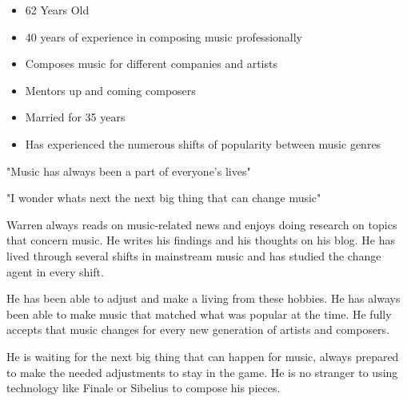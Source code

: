 \begin{itemize}
\item 62 Years Old
\item 40 years of experience in composing music professionally
\item Composes music for different companies and artists
\item Mentors up and coming composers
\item Married for 35 years
\item Has experienced the numerous shifts of popularity between music genres
\end{itemize}

"Music has always been a part of everyone's lives" 

"I wonder whats next the next big thing that can change music" 

Warren always reads on music-related news and enjoys doing research on topics that concern music. He writes his findings and his thoughts on his blog. He has lived through several shifts in mainstream music and has studied the change agent in every shift. 

He has been able to adjust and make a living from these hobbies. He has always been able to make music that matched what was popular at the time. He fully accepts that music changes for every new generation of artists and composers.

He is waiting for the next big thing that can happen for music, always prepared to make the needed adjustments to stay in the game. He is no stranger to using technology like Finale or Sibelius to compose his pieces.

\begin{comment}
\chapter{Resource Persons}
\label{sec:appendixf}

\newcommand{\resperson}[4]{\textbf{#1} \\ #2 \\ #3 \\ \url{#4}\vspace{0.5em}\\}

\resperson{Mr. Jordan Aiko Deja}{Adviser}{College of Computer Studies\\De La Salle University-Manila}{jordan.deja@dlsu.edu.ph}
\\
\resperson{Dr. Rafael Cabredo}{Chair, Software Technology Department}{College of Computer Studies\\De La Salle University-Manila}{rafael.cabredo@dlsu.edu.ph}

\end{comment}


